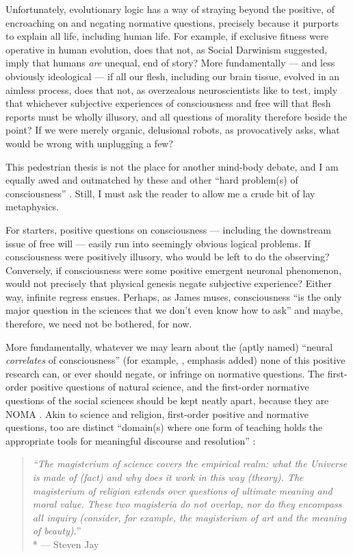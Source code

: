 Unfortunately, evolutionary logic has a way of straying beyond the positive, of encroaching on and negating normative questions, precisely because it purports to explain all life, including human life.
For example, if exclusive fitness were operative in human evolution, does that not, as Social Darwinism suggested, imply that humans \emph{are} unequal, end of story?
More fundamentally --- and less obviously ideological --- if all our flesh, including our brain tissue, evolved in an aimless process, does that not, as overzealous neuroscientists like to test, imply that whichever subjective experiences of consciousness and free will that flesh reports must be wholly illusory, and all questions of morality therefore beside the point?
If we were merely organic, delusional robots, as \citet[Chapter 23]{Wright2000} provocatively asks, what would be wrong with unplugging a few?

This pedestrian thesis is not the place for another mind-body debate, and I am equally awed and outmatched by these and other ``hard problem(s) of consciousness''  \citep{Chalmers1995}.
Still, I must ask the reader to allow me a crude bit of lay metaphysics.

For starters, positive questions on consciousness --- including the downstream issue of free will --- easily run into seemingly obvious logical problems.
If consciousness were positively illusory, who would be left to do the observing?
Conversely, if consciousness were some positive emergent neuronal phenomenon, would not precisely that physical genesis negate subjective experience?
Either way, infinite regress ensues. Perhaps, as James \citeauthor{Trefil1997} muses, consciousness ``is the only major question in the sciences that we don't even know how to ask'' \citeyearpar[15]{Trefil1997} and maybe, therefore, we need not be bothered, for now.

More fundamentally, whatever we may learn about the (aptly named) ``neural \emph{correlates} of consciousness'' (for example, \citealt{Koch2004}, emphasis added) none of this positive research can, or ever should negate, or infringe on normative questions.
The first-order positive questions of natural science, and the first-order normative questions of the social sciences should be kept neatly apart, because they are \gls{NOMA} \citep{Gould1997}.
Akin to science and religion, first-order positive and normative questions, too are distinct ``domain(s) where one form of teaching holds the appropriate tools for meaningful discourse and resolution'' \citep[3]{Gould2002}:
\begin{quote}
	\emph{``The magisterium of science covers the empirical realm: what the Universe is made of (fact) and why does it work in this way (theory). The magisterium of religion extends over questions of ultimate meaning and moral value. These two magisteria do not overlap, nor do they encompass all inquiry (consider, for example, the magisterium of art and the meaning of beauty).}''\\*
	--- Steven Jay \citet[6]{Gould2002} %
\end{quote}


